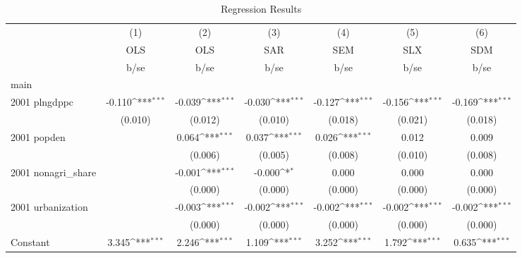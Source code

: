 \begin{table}[htbp]\centering
\def\sym#1{\ifmmode^{#1}\else\(^{#1}\)\fi}
\caption{Regression Results}
\begin{tabular}{l*{6}{c}}
\hline\hline
                    &\multicolumn{1}{c}{(1)}&\multicolumn{1}{c}{(2)}&\multicolumn{1}{c}{(3)}&\multicolumn{1}{c}{(4)}&\multicolumn{1}{c}{(5)}&\multicolumn{1}{c}{(6)}\\
                    &\multicolumn{1}{c}{OLS}&\multicolumn{1}{c}{OLS}&\multicolumn{1}{c}{SAR}&\multicolumn{1}{c}{SEM}&\multicolumn{1}{c}{SLX}&\multicolumn{1}{c}{SDM}\\
                    &        b/se         &        b/se         &        b/se         &        b/se         &        b/se         &        b/se         \\
\hline
main                &                     &                     &                     &                     &                     &                     \\
2001 plngdppc       &      -0.110\sym{***}&      -0.039\sym{***}&      -0.030\sym{***}&      -0.127\sym{***}&      -0.156\sym{***}&      -0.169\sym{***}\\
                    &     (0.010)         &     (0.012)         &     (0.010)         &     (0.018)         &     (0.021)         &     (0.018)         \\
2001 popden         &                     &       0.064\sym{***}&       0.037\sym{***}&       0.026\sym{***}&       0.012         &       0.009         \\
                    &                     &     (0.006)         &     (0.005)         &     (0.008)         &     (0.010)         &     (0.008)         \\
2001 nonagri\_share  &                     &      -0.001\sym{***}&      -0.000\sym{*}  &       0.000         &       0.000         &       0.000         \\
                    &                     &     (0.000)         &     (0.000)         &     (0.000)         &     (0.000)         &     (0.000)         \\
2001 urbanization   &                     &      -0.003\sym{***}&      -0.002\sym{***}&      -0.002\sym{***}&      -0.002\sym{***}&      -0.002\sym{***}\\
                    &                     &     (0.000)         &     (0.000)         &     (0.000)         &     (0.000)         &     (0.000)         \\
Constant            &       3.345\sym{***}&       2.246\sym{***}&       1.109\sym{***}&       3.252\sym{***}&       1.792\sym{***}&       0.635\sym{***}\\

\end{tabular}
\end{table}
